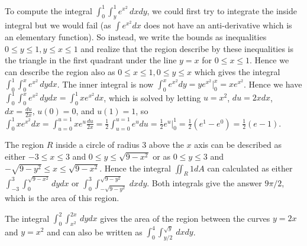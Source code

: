\begin{example}
To compute the integral $\int_0^1\int_y^1
e^{x^2}\,dxdy$, we could first try to integrate the inside integral but
we would fail (as $\int e^{x^2}dx$ does not have an anti-derivative which
is an elementary function). So instead, we write the bounds as
inequalities $0\leq y\leq 1, y\leq x\leq 1$ and realize that the region describe
by these inequalities is the triangle in the first quadrant under the
line $y=x$ for $0\leq x\leq 1$.  Hence we can describe the region also as
$0\leq x\leq 1, 0\leq y\leq x$ which gives the integral $\int_0^1\int_0^x e^{x^2}\,dydx$.
The inner integral is now $\int_0^x e^{x^2}dy = ye^{x^2}\big|_0^x =
xe^{x^2}$.  Hence we have $\int_0^1\int_0^x e^{x^2}\,dydx = \int_0^1 xe^{x^2}dx$,
which is solved by letting $u=x^2$, $du=2xdx$, $dx=\frac{du}{2x}$,
$u(0)=0$, and $u(1)=1$, so $\int_0^1 xe^{x^2}dx = \int_{u=0}^{u=1} x
e^{u}\frac{du}{2x} =  \frac{1}{2}\int_{u=0}^{u=1} e^{u}du =
\frac{1}{2}e^u\big|_0^1 = \frac{1}{2}(e^1-e^0) = \frac{1}{2}(e-1)$.
\end{example}

\begin{example}
The region $R$ inside a circle of radius 3 above the $x$ axis can be
described as either $-3\leq x\leq 3$ and $0\leq y\leq \sqrt{9-x^2}$ or as $0\leq y\leq 3$ and
$-\sqrt{9-y^2}\leq x\leq \sqrt{9-x^2}$.  Hence the integral $\iint_R  1 dA$
can calculated as either $\int_{-3}^{3}\int_{0}^{\sqrt{9-x^2}}dydx$ or
$\int_{0}^{3}\int_{-\sqrt{9-y^2}}^{\sqrt{9-y^2}}\,dxdy$.  Both integrals give
the answer $9\pi/2$, which is the area of this region.  
\end{example}

\begin{example}\label{ex:double-integral}
The integral $\int_0^2\int_{x^2}^{2x}\,dydx$ gives the area of the region
between the curves $y=2x$ and $y=x^2$ and can also be written as
$\int_0^4\int_{y/2}^{\sqrt{y}}\,dxdy$.
%
\end{example}




